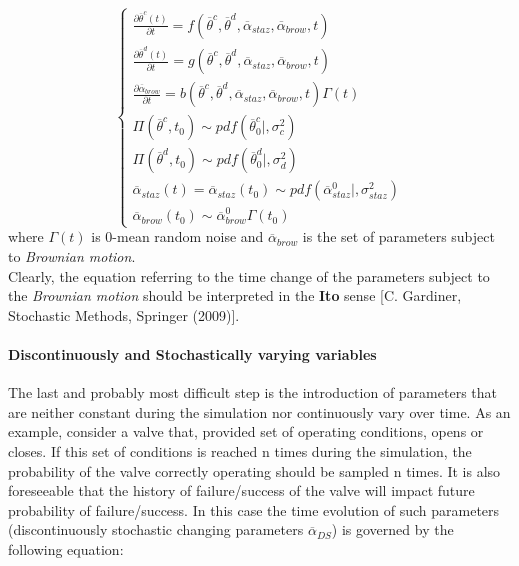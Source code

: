 \begin{equation}
\label{eq:systemThetaContAndDescreteStazAndBrow}
\left\{\begin{matrix}
\frac{\partial  \overline{\theta}^{c}\left ( t \right )}{\partial t}=f\left ( \overline{\theta}^{c},\overline{\theta}^{d}, \overline{\alpha}_{staz} ,\overline{\alpha}_{brow},      t \right ) \\ 
\frac{\partial  \overline{\theta}^{d}\left ( t \right )}{\partial t}=g\left ( \overline{\theta}^{c},\overline{\theta}^{d},\overline{\alpha}_{staz},\overline{\alpha}_{brow},t \right )\\
\frac{\partial \overline{\alpha}_{brow} }{\partial t}=b\left ( \overline{\theta}^{c},\overline{\theta}^{d},\overline{\alpha}_{staz},\overline{\alpha}_{brow},t \right )\Gamma \left ( t \right )
\\
\Pi \left ( \overline{\theta}^{c},t_{0} \right ) \sim pdf\left ( \overline{\theta}^{c}_{0}|,\sigma_{c}^{2} \right )\\ 
\Pi \left ( \overline{\theta}^{d},t_{0} \right ) \sim pdf\left ( \overline{\theta}^{d}_{0}|,\sigma_{d}^{2} \right ) \\
\overline{\alpha}_{staz}\left ( t \right )=\overline{\alpha}_{staz}\left ( t_{0} \right ) \sim pdf\left ( \overline{\alpha}_{staz}^{0}|, \sigma_{staz}^{2} \right ) \\
\overline{\alpha}_{brow}\left ( t_{0} \right ) \sim  \overline{\alpha}_{brow}^{0} \Gamma \left ( t_{0} \right )
\end{matrix}\right.
\end{equation}
where $\Gamma \left ( t \right )$ is 0-mean random noise and $\overline{\alpha}_{brow}$ is the set of parameters subject to \textit{Brownian motion}.
\\Clearly, the equation referring to the time change of the parameters subject to the \textit{Brownian motion} should be interpreted in the \textbf{Ito} sense [C. Gardiner, Stochastic Methods, Springer (2009)].

\paragraph{Discontinuously and Stochastically varying variables}
The last and probably most difficult step is the introduction of parameters that are neither constant during the simulation nor continuously vary over time. As an example, consider a valve that, provided set of operating conditions, opens or closes. If this set of conditions is reached n times during the simulation, the probability of the valve correctly operating should be sampled n times. It is also foreseeable that the history of failure/success of the valve will impact future probability of failure/success.  In this case the time evolution of such parameters (discontinuously stochastic changing parameters  $\overline{\alpha}_{DS}$) is governed by the following equation:

